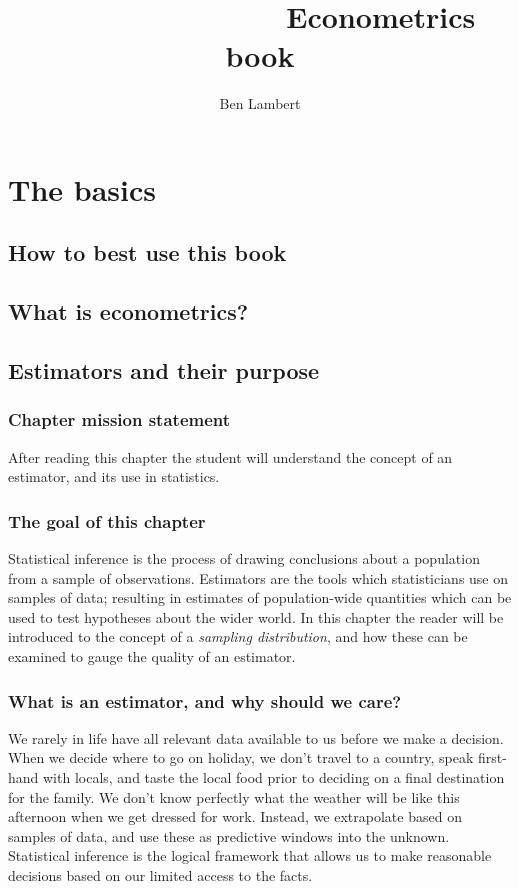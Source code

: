 \documentclass[11pt,fullpage]{book}
\title{\textbf{~~~~~~~~~~~~~~~}\newline Econometrics book}
\author{Ben Lambert}
\begin{document}
\tableofcontents
\part{The basics}
\chapter{How to best use this book}
\chapter{What is econometrics?}

\chapter{Estimators and their purpose}
\section{Chapter mission statement}
After reading this chapter the student will understand the concept of an estimator, and its use in statistics. 

\section{The goal of this chapter}
Statistical inference is the process of drawing conclusions about a population from a sample of observations. Estimators are the tools which statisticians use on samples of data; resulting in estimates of population-wide quantities which can be used to test hypotheses about the wider world. In this chapter the reader will be introduced to the concept of a \textit{sampling distribution}, and how these can be examined to gauge the quality of an estimator. 

\section{What is an estimator, and why should we care?}
We rarely in life have all relevant data available to us before we make a decision. When we decide where to go on holiday, we don't travel to a country, speak first-hand with locals, and taste the local food prior to deciding on a final destination for the family. We don't know perfectly what the weather will be like this afternoon when we get dressed for work. Instead, we extrapolate based on samples of data, and use these as predictive windows into the unknown. Statistical inference is the logical framework that allows us to make reasonable decisions based on our limited access to the facts. 
\end{document}

